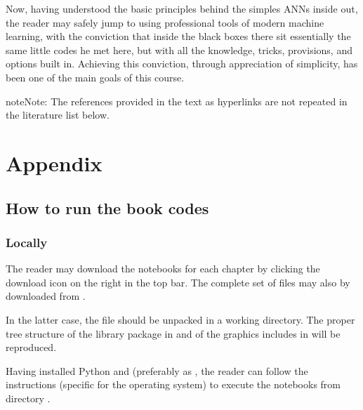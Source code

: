 \documentclass[letterpaper,10pt,english]{jupyterBook}
\begin{document}
\sphinxAtStartPar
Now, having understood the basic principles behind the simples ANNs inside out, the reader may safely jump to using professional tools of modern machine learning, with the conviction that inside the black boxes there sit essentially the same little codes he met here, but with all the knowledge, tricks, provisions, and options built in. Achieving this conviction, through appreciation of simplicity, has been one of the main goals of this course.

\begin{sphinxadmonition}{note}{Note:}
\sphinxAtStartPar
The references provided in the text as hyperlinks are not repeated in the literature list below.
\end{sphinxadmonition}

\sphinxAtStartPar



\chapter{Appendix}
\label{\detokenize{docs/appendix:appendix}}\label{\detokenize{docs/appendix::doc}}

\section{How to run the book codes}
\label{\detokenize{docs/appendix:how-to-run-the-book-codes}}\label{\detokenize{docs/appendix:app-run}}

\subsection{Locally}
\label{\detokenize{docs/appendix:locally}}
\sphinxAtStartPar
The reader may download the  notebooks for each chapter by clicking the download icon on the right in the top bar. The complete set of files may also by downloaded from .

\sphinxAtStartPar
In the latter case, the file  should be unpacked in a working directory. The proper tree structure of the library package in  and of the graphics includes in  will be reproduced.

\sphinxAtStartPar
Having installed Python and  (preferably as  , the reader can follow the instructions (specific for the operating system) to execute the notebooks from directory .
\end{document}
